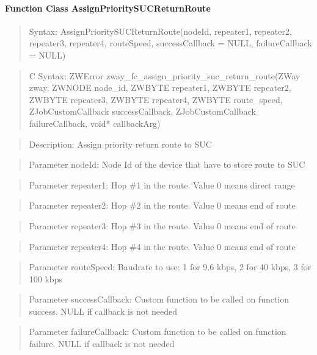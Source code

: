 \paragraph{Function Class AssignPrioritySUCReturnRoute}
\begin{quote}Syntax: AssignPrioritySUCReturnRoute(nodeId, repeater1, repeater2, repeater3, repeater4, routeSpeed, successCallback = NULL, failureCallback = NULL)\end{quote}
\begin{quote}C Syntax: ZWError zway\_fc\_assign\_priority\_suc\_return\_route(ZWay zway, ZWNODE node\_id, ZWBYTE repeater1, ZWBYTE repeater2, ZWBYTE repeater3, ZWBYTE repeater4, ZWBYTE route\_speed, ZJobCustomCallback successCallback, ZJobCustomCallback failureCallback, void* callbackArg)\end{quote}
\begin{quote}Description: Assign priority return route to SUC\end{quote}
\begin{quote}Parameter nodeId: Node Id of the device that have to store route to SUC\end{quote}
\begin{quote}Parameter repeater1: Hop \#1 in the route. Value 0 means direct range\end{quote}
\begin{quote}Parameter repeater2: Hop \#2 in the route. Value 0 means end of route\end{quote}
\begin{quote}Parameter repeater3: Hop \#3 in the route. Value 0 means end of route\end{quote}
\begin{quote}Parameter repeater4: Hop \#4 in the route. Value 0 means end of route\end{quote}
\begin{quote}Parameter routeSpeed: Baudrate to use: 1 for 9.6 kbps, 2 for 40 kbps, 3 for 100 kbps\end{quote}
\begin{quote}Parameter successCallback: Custom function to be called on function success. NULL if callback is not needed\end{quote}
\begin{quote}Parameter failureCallback: Custom function to be called on function failure. NULL if callback is not needed\end{quote}


